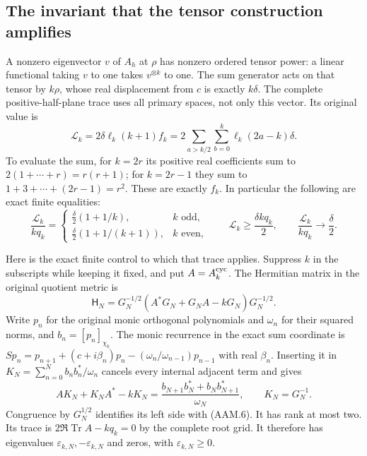 \subsection{The invariant that the tensor construction amplifies}

A nonzero eigenvector $v$ of $A_h$ at $\rho$ has nonzero ordered
tensor power: a linear functional taking $v$ to one takes
$v^{\otimes k}$ to one. The sum generator acts on that tensor by
$k\rho$, whose real displacement from $c$ is exactly $k\delta$.
The complete positive-half-plane trace uses all primary spaces,
not only this vector. Its original value is
\[
 \mathcal L_k=2\delta\ell_k(k+1)f_k
 =2\sum_{a>k/2}\sum_{b=0}^k\ell_k(2a-k)\delta.
 \tag{AAM.4}
\]
To evaluate the sum, for $k=2r$ its positive real coefficients sum
to $2(1+\cdots+r)=r(r+1)$; for $k=2r-1$ they sum to
$1+3+\cdots+(2r-1)=r^2$. These are exactly $f_k$.
In particular the following are exact finite equalities:
\[
 \frac{\mathcal L_k}{kq_k}
 =\begin{cases}\displaystyle\frac\delta2(1+1/k),&k\text{ odd},\\[2pt]
 \displaystyle\frac\delta2(1+1/(k+1)),&k\text{ even},\end{cases}
 \qquad
 \mathcal L_k\geq\frac{\delta kq_k}{2},\qquad
 \frac{\mathcal L_k}{kq_k}\longrightarrow\frac\delta2.
 \tag{AAM.5}
\]

Here is the exact finite control to which that trace applies. Suppress
$k$ in the subscripts while keeping it fixed, and put $A=A_k^{\rm cyc}$.
The Hermitian matrix in the original quotient metric is
\[
 \mathsf H_N=G_N^{-1/2}(A^*G_N+G_NA-kG_N)G_N^{-1/2}.
 \tag{AAM.6}
\]
Write $p_n$ for the original monic orthogonal polynomials and
$\omega_n$ for their squared norms, and $b_n=[p_n]_{\chi_k}$.
The monic recurrence in the exact sum coordinate is
$Sp_n=p_{n+1}+(c+i\beta_n)p_n
 -(\omega_n/\omega_{n-1})p_{n-1}$ with real $\beta_n$.
Inserting it in $K_N=\sum_{n=0}^Nb_nb_n^*/\omega_n$ cancels
every internal adjacent term and gives
\[
 AK_N+K_NA^*-kK_N
   =\frac{b_{N+1}b_N^*+b_Nb_{N+1}^*}{\omega_N},
 \qquad K_N=G_N^{-1}.
 \tag{AAM.7}
\]
Congruence by $G_N^{1/2}$ identifies its left side with (AAM.6).
It has rank at most two. Its trace is
$2\Re\operatorname{Tr}A-kq_k=0$ by the complete root grid.
It therefore has eigenvalues $\varepsilon_{k,N},-\varepsilon_{k,N}$
and zeros, with $\varepsilon_{k,N}\geq0$.

